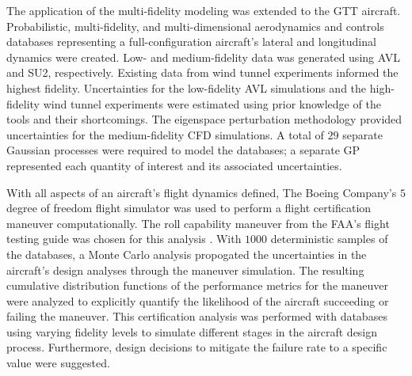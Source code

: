 The application of the multi-fidelity modeling was extended to the GTT aircraft.
Probabilistic, multi-fidelity, and multi-dimensional aerodynamics and controls databases representing a full-configuration aircraft's lateral and longitudinal dynamics were created.
Low- and medium-fidelity data was generated using AVL and SU2, respectively.
Existing data from wind tunnel experiments informed the highest fidelity.
Uncertainties for the low-fidelity AVL simulations and the high-fidelity wind tunnel experiments were estimated using prior knowledge of the tools and their shortcomings. 
The eigenspace perturbation methodology provided uncertainties for the medium-fidelity CFD simulations. 
A total of $29$ separate Gaussian processes were required to model the databases; a separate GP represented each quantity of interest and its associated uncertainties.

With all aspects of an aircraft's flight dynamics defined, The Boeing Company's $5$ degree of freedom flight simulator was used to perform a flight certification maneuver computationally. 
The roll capability maneuver from the FAA's flight testing guide was chosen for this analysis \cite{romanowski_flight_2018}.
With $1000$ deterministic samples of the databases, a Monte Carlo analysis propogated the uncertainties in the aircraft's design analyses through the maneuver simulation. 
The resulting cumulative distribution functions of the performance metrics for the maneuver were analyzed to explicitly quantify the likelihood of the aircraft succeeding or failing the maneuver.
This certification analysis was performed with databases using varying fidelity levels to simulate different stages in the aircraft design process.
Furthermore, design decisions to mitigate the failure rate to a specific value were suggested. 